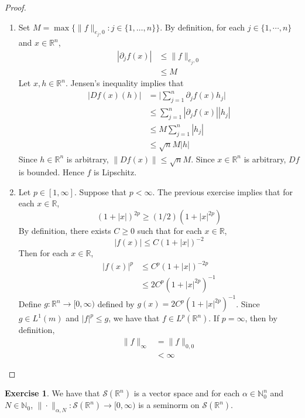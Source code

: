 \documentclass[12pt]{amsart}
\theoremstyle{definition}
\newtheorem{ex}[definition]{Exercise}
\newcommand{\p}{\partial}
\newcommand{\al}{\alpha}
\newcommand{\N}{\mathbb{N}}
\newcommand{\R}{\mathbb{R}}
\newcommand{\MS}{\mathcal{S}}
\newcommand{\Rg}{[0,\infty)}
\begin{document}
	\begin{proof}\
		\begin{enumerate}
			\item Set $M = \max \{\|f\|_{e_j, 0} : j \in \{1, \ldots, n\}\}$. By definition, for each $j \in \{1, \cdots, n\}$ and $x \in \R^n$, 
			\begin{align*}
				| \p_j f(x)| 
				& \leq \|f\|_{e_j, 0} \\
				& \leq M  
			\end{align*}
			Let $x, h \in \R^n$. Jensen's inequality implies that
			\begin{align*}
				|Df(x)(h)|
				& = \bigg| \sum_{j = 1}^n \p_jf(x) h_j \bigg| \\
				& \leq \sum_{j = 1}^n |\p_jf(x)| |h_j| \\
				& \leq M \sum_{j = 1}^n |h_j| \\
				& \leq \sqrt{n} M |h| 
			\end{align*}
			Since $h \in \R^n$ is arbitrary, $\|Df(x)\| \leq \sqrt{n}M$. Since $x \in \R^n$ is arbitrary, $Df$ is bounded. Hence $f$ is Lipschitz.
			\item Let $p \in [1, \infty]$. Suppose that $p < \infty$. The previous exercise implies that for each $x \in \R$, 
			$$(1 + |x|)^{2p} \geq (1/2) (1 + |x|^{2p})$$
			By definition, there exists $C \geq 0$ such that for each $x \in \R$, 
			$$|f(x)| \leq C(1+|x|)^{-2} $$
			Then for each $x \in \R$,
			\begin{align*}
				|f(x)|^p 
				& \leq C^p(1+|x|)^{-2p} \\
				& \leq 2C^p(1+|x|^{2p})^{-1}
			\end{align*}
			Define $g:\R^n \rightarrow \Rg$ defined by $g(x) = 2C^{p}(1+|x|^{2p})^{-1}$. Since $g \in L^1(m)$ and $|f|^p \leq g$, we have that $f \in L^p(\R^n)$. If $p = \infty$, then by definition, 
			\begin{align*}
				\|f\|_\infty 
				& = \|f\|_{0,0} \\
				& < \infty 
			\end{align*}
		\end{enumerate}
	\end{proof}

	\begin{ex} We have that $\MS(\R^n)$ is a vector space and for each $\al \in \N_0^n$ and $N \in  \N_0$,  $\| \cdot \|_{\al, N}: \MS(\R^n) \rightarrow \Rg$ is a seminorm on $\MS(\R^n)$.
	\end{ex}
\end{document}
